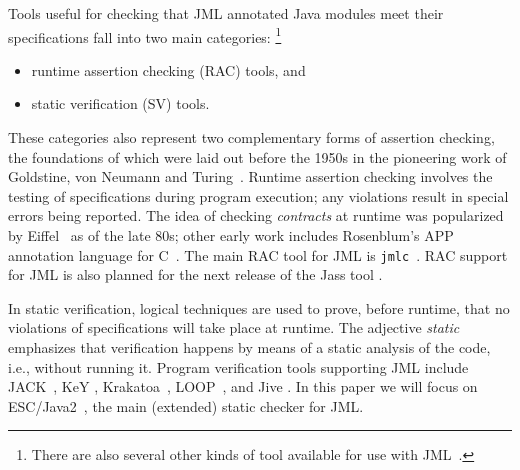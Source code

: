 \documentclass{llncs}
\begin{document}
Tools useful for checking that JML annotated Java modules meet their
specifications fall into two main categories:%
%
\footnote{There are also several other kinds of tool available for use
  with JML~\cite{STTT05}.}
%
\begin{itemize}
  \item runtime assertion checking (RAC) tools, and
  \item static verification (SV) tools.
\end{itemize}
%
These categories also represent two complementary forms of assertion checking, the
foundations of which were laid out before the 1950s in the pioneering work
of Goldstine, von Neumann and Turing~\cite{Jones03}.
%
Runtime assertion checking involves the testing of specifications during
program execution; any violations result in special errors being reported.
%
The idea of checking \emph{contracts} at runtime
was popularized by Eiffel~\cite{Meyer97} as of the late 80s; other early work includes
Rosenblum's APP annotation language for C~\cite{Rosenblum92,Rosenblum95}.
%
The main RAC tool for JML is \texttt{jmlc}~\cite{Cheon-Leavens02b}.
RAC support for JML is also planned for the next release of the Jass tool
\cite{Bartetzko-etal01}.

In static verification,
logical techniques are used to prove, before runtime, that no violations of
specifications will take place at runtime.
The adjective \emph{static\/} emphasizes that verification
happens by means of a static analysis of the code, i.e., without running it.
%
%
Program verification tools supporting JML include JACK~\cite{JACK}, KeY
\cite{KeY}, Krakatoa~\cite{Krakatoa}, LOOP~\cite{LOOP}, and Jive
\cite{Jive00}.  In this paper we will focus on ESC/Java2~\cite{Cok-Kiniry04},
the main (extended) static checker for JML.
\end{document}
